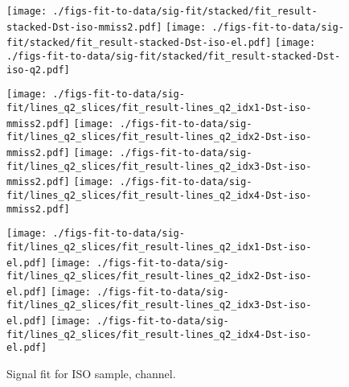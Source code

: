 \begin{figure}[htb]
    \centering
    \texttt{[image: ./figs-fit-to-data/sig-fit/stacked/fit\_result-stacked-Dst-iso-mmiss2.pdf]}
    \texttt{[image: ./figs-fit-to-data/sig-fit/stacked/fit\_result-stacked-Dst-iso-el.pdf]}
    \texttt{[image: ./figs-fit-to-data/sig-fit/stacked/fit\_result-stacked-Dst-iso-q2.pdf]}

    \texttt{[image: ./figs-fit-to-data/sig-fit/lines\_q2\_slices/fit\_result-lines\_q2\_idx1-Dst-iso-mmiss2.pdf]}
    \texttt{[image: ./figs-fit-to-data/sig-fit/lines\_q2\_slices/fit\_result-lines\_q2\_idx2-Dst-iso-mmiss2.pdf]}
    \texttt{[image: ./figs-fit-to-data/sig-fit/lines\_q2\_slices/fit\_result-lines\_q2\_idx3-Dst-iso-mmiss2.pdf]}
    \texttt{[image: ./figs-fit-to-data/sig-fit/lines\_q2\_slices/fit\_result-lines\_q2\_idx4-Dst-iso-mmiss2.pdf]}

    \texttt{[image: ./figs-fit-to-data/sig-fit/lines\_q2\_slices/fit\_result-lines\_q2\_idx1-Dst-iso-el.pdf]}
    \texttt{[image: ./figs-fit-to-data/sig-fit/lines\_q2\_slices/fit\_result-lines\_q2\_idx2-Dst-iso-el.pdf]}
    \texttt{[image: ./figs-fit-to-data/sig-fit/lines\_q2\_slices/fit\_result-lines\_q2\_idx3-Dst-iso-el.pdf]}
    \texttt{[image: ./figs-fit-to-data/sig-fit/lines\_q2\_slices/fit\_result-lines\_q2\_idx4-Dst-iso-el.pdf]}

    \caption{Signal fit for ISO sample, \Dstar channel.}
    \label{fig:sig-dst}
\end{figure}
